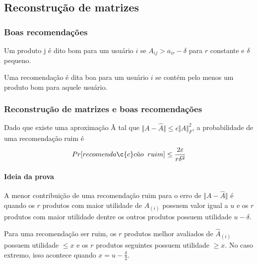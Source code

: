 \documentclass[a4paper,10pt]{article}
\begin{document}
\subsection{Reconstrução de matrizes}

\subsubsection{Boas recomendações}
\begin{definicao} \label{definicao:box} Um produto j é dito bom para um
usuário $i$ se $A_{ij} > a_{ir} - \delta$ para $r$ constante e $\delta$ pequeno.
\end{definicao}
\begin{definicao} \label{definicao:box}Uma recomendação é dita boa para um usuário
$i$ se contém pelo menos um produto bom para aquele usuário.
\end{definicao}

\subsubsection{Reconstrução de matrizes e boas recomendações}

\begin{lema} \label{lema:box}
Dado que existe uma aproximação Â tal que $\Vert A - \hat{A} \Vert \le \epsilon \Vert A
\Vert^2_F$, a probabilidade de uma recomenda\c{c}\~ao
ruim é 
\begin{equation}
Pr [ recomenda \c{c}c \tilde ao \;\; ruim ] \leq \frac{2\varepsilon}{r\delta^2}
\end{equation} 

\end{lema}

\paragraph{Ideia da prova\\}

A menor contribuição de uma recomendação ruim para o erro de $\Vert A - 
\hat{A} \Vert$ é quando os $r$ produtos com maior utilidade 
de $A_{(i)}$ possuem valor igual a $u$ e os $r$ produtos com maior utilidade
dentre os outros produtos possuem utilidade $u - \delta$.
 
Para uma recomendação ser ruim, os $r$ produtos melhor avaliados de $\hat{A}_{(i)}$
possuem utilidade $\leq x$ e os $r$ produtos seguintes possuem utilidade
$\geq x$. No caso extremo, isso acontece quando $x = u - \frac{\delta}{2}$. 
\end{document}
